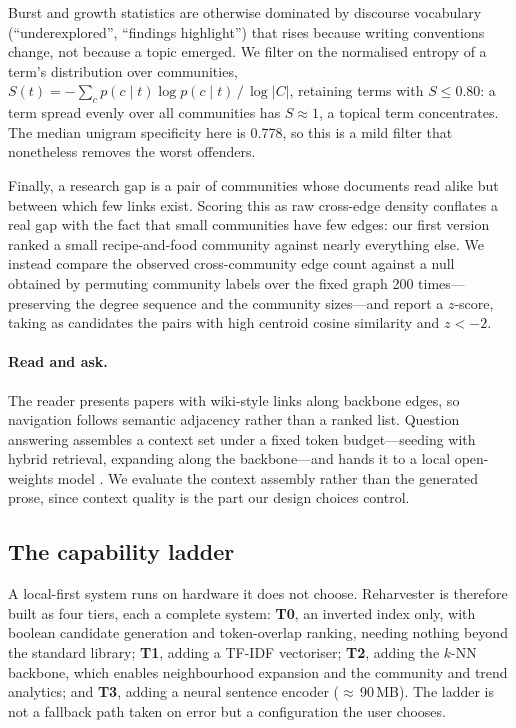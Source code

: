 \documentclass[runningheads]{llncs}
\begin{document}
Burst and growth statistics are otherwise dominated by discourse vocabulary
(``underexplored'', ``findings highlight'') that rises because writing conventions
change, not because a topic emerged. We filter on the normalised entropy of a term's
distribution over communities,
$S(t) = -\sum_{c} p(c \mid t) \log p(c \mid t) \,/\, \log |C|$, retaining terms with
$S \le 0.80$: a term spread evenly over all communities has $S \approx 1$, a topical
term concentrates. The median unigram specificity here is 0.778, so this is a mild
filter that nonetheless removes the worst offenders.

Finally, a research gap is a pair of communities whose documents read alike but between
which few links exist. Scoring this as raw cross-edge density conflates a real gap with
the fact that small communities have few edges: our first version ranked a small
recipe-and-food community against nearly everything else. We instead compare the observed
cross-community edge count against a null obtained by permuting community labels over the
fixed graph 200 times---preserving the degree sequence and the community sizes---and
report a $z$-score, taking as candidates the pairs with high centroid cosine similarity
and $z < -2$.

\paragraph{Read and ask.}
The reader presents papers with wiki-style links along backbone edges, so navigation
follows semantic adjacency rather than a ranked list. Question answering assembles a
context set under a fixed token budget---seeding with hybrid retrieval, expanding along
the backbone---and hands it to a local open-weights model \cite{jiang2023}. We evaluate
the context assembly rather than the generated prose, since context quality is the part
our design choices control.

\subsection{The capability ladder}
\label{sec:ladder}
A local-first system runs on hardware it does not choose. Reharvester is therefore built
as four tiers, each a complete system: \textbf{T0}, an inverted index only, with boolean
candidate generation and token-overlap ranking, needing nothing beyond the standard
library; \textbf{T1}, adding a TF-IDF vectoriser; \textbf{T2}, adding the $k$-NN
backbone, which enables neighbourhood expansion and the community and trend analytics;
and \textbf{T3}, adding a neural sentence encoder ($\approx$\,90\,MB). The ladder is not
a fallback path taken on error but a configuration the user chooses.
\end{document}
